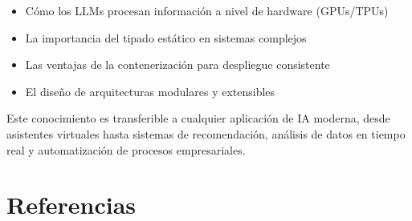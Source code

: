 \documentclass[12pt,a4paper]{article}
\begin{document}
\begin{itemize}
    \item Cómo los LLMs procesan información a nivel de hardware (GPUs/TPUs)
    \item La importancia del tipado estático en sistemas complejos
    \item Las ventajas de la contenerización para despliegue consistente
    \item El diseño de arquitecturas modulares y extensibles
\end{itemize}

Este conocimiento es transferible a cualquier aplicación de IA moderna, desde asistentes virtuales hasta sistemas de recomendación, análisis de datos en tiempo real y automatización de procesos empresariales.

\newpage

\section{Referencias}
\end{document}
